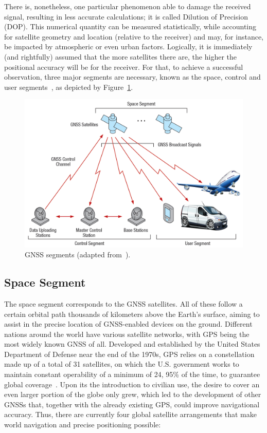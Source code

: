 There is, nonetheless, one particular phenomenon able to damage the received signal, resulting in less accurate calculations; it is called Dilution of Precision (DOP). This numerical quantity can be measured statistically, while accounting for satellite geometry and location (relative to the receiver) and may, for instance, be impacted by atmospheric or even urban factors.
Logically, it is immediately (and rightfully) assumed that the more satellites there are, the higher the positional accuracy will be for the receiver. For that, to achieve a successful observation, three major segments are necessary, known as the space, control and user segments~\cite{gps_USGov,novatel_gnss,ayers_geosystems_2011}, as depicted by Figure~\ref{fig:s_c_u_segment}.

\begin{figure}[ht]
	\centering
	\includegraphics[width=1.0\textwidth]{Chapters/Figures/s_c_u_segment.png}
	\caption{GNSS segments (adapted from~\cite{novatel_gnss}).}
	\label{fig:s_c_u_segment}
\end{figure}

\subsection{Space Segment}\label{sec:II_gnss_space_seg}

The space segment corresponds to the GNSS satellites. All of these follow a certain orbital path thousands of kilometers above the Earth's surface, aiming to assist in the precise location of GNSS-enabled devices on the ground.
Different nations around the world have various satellite networks, with GPS being the most widely known GNSS of all. Developed and established by the United States Department of Defense near the end of the 1970s, GPS relies on a constellation made up of a total of 31 satellites, on which the U.S. government works to maintain constant operability of a minimum of 24, 95\% of the time, to guarantee global coverage~\cite{gps_USGov}.
Upon its the introduction to civilian use, the desire to cover an even larger portion of the globe only grew, which led to the development of other GNSSs that, together with the already existing GPS, could improve navigational accuracy. Thus, there are currently four global satellite arrangements that make world navigation and precise positioning possible:

